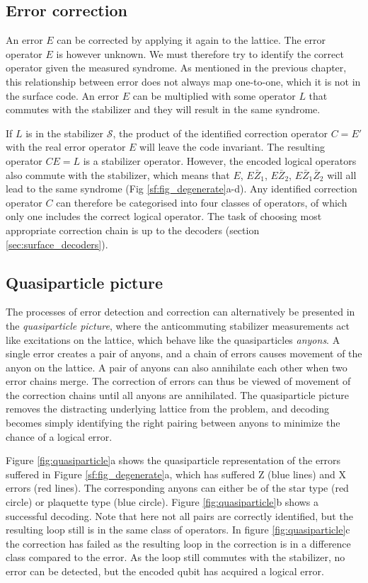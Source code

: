 \subsection{Error correction}

An error $E$ can be corrected by applying it again to the lattice. The error operator $E$ is however unknown. We must therefore try to identify the correct operator given the measured syndrome. As mentioned in the previous chapter, this relationship between error does not always map one-to-one, which it is not in the surface code. An error $E$ can be multiplied with some operator $L$ that commutes with the stabilizer and they will result in the same syndrome.

If $L$ is in the stabilizer $\mathcal{S}$, the product of the identified correction operator $C=E'$ with the real error operator $E$ will leave the code invariant. The resulting operator $CE=L$ is a stabilizer operator. However, the encoded logical operators also commute with the stabilizer, which means that $E$, $E\bar{Z}_1$, $E\bar{Z}_2$, $E\bar{Z}_1\bar{Z}_2$ will all lead to the same syndrome (Fig \ref{sf:fig_degenerate}a-d). Any identified correction operator $C$ can therefore be categorised into four classes of operators, of which only one includes the correct logical operator. The task of choosing most appropriate correction chain is up to the decoders (section \ref{sec:surface_decoders}).

\subsection{Quasiparticle picture}

The processes of error detection and correction can alternatively be presented in the \emph{quasiparticle picture}, where the anticommuting stabilizer measurements act like excitations on the lattice, which behave like the quasiparticles \emph{anyons}. A single error creates a pair of anyons, and a chain of errors causes movement of the anyon on the lattice. A pair of anyons can also annihilate each other when two error chains merge. The correction of errors can thus be viewed of movement of the correction chains until all anyons are annihilated. The quasiparticle picture removes the distracting underlying lattice from the problem, and decoding becomes simply identifying the right pairing between anyons to minimize the chance of a logical error.

Figure \ref{fig:quasiparticle}a shows the quasiparticle representation of the errors suffered in Figure \ref{sf:fig_degenerate}a, which has suffered Z (blue lines) and X errors (red lines). The corresponding anyons can either be of the star type (red circle) or plaquette type (blue circle). Figure \ref{fig:quasiparticle}b shows a successful decoding. Note that here not all pairs are correctly identified, but the resulting loop still is in the same class of operators. In figure \ref{fig:quasiparticle}c the correction has failed as the resulting loop in the correction is in a difference class compared to the error. As the loop still commutes with the stabilizer, no error can be detected, but the encoded qubit has acquired a logical error.

